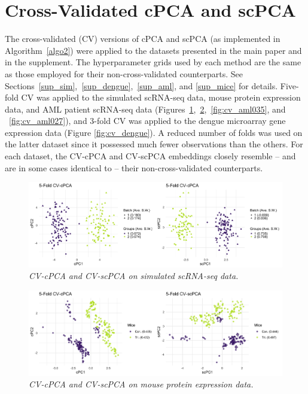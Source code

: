 \documentclass{article}
\begin{document}
\newpage

\section{Cross-Validated cPCA and scPCA}\label{cv_algo_example}

The cross-validated (CV) versions of cPCA and scPCA (as implemented in Algorithm~\ref{algo2}) were applied to the datasets presented in the main paper and in the supplement. The hyperparameter grids used by each method are the same as those employed for their non-cross-validated counterparts. See Sections~\ref{sup_sim},~\ref{sup_dengue},~\ref{sup_aml}, and \ref{sup_mice} for details. Five-fold CV was applied to the simulated scRNA-seq data, mouse protein expression data, and AML patient scRNA-seq data (Figures~\ref{fig:cv_sim},~\ref{fig:cv_mice},~\ref{fig:cv_aml035}, and ~\ref{fig:cv_aml027}), and 3-fold CV was applied to the dengue microarray gene expression data (Figure \ref{fig:cv_dengue}). A reduced number of folds was used on the latter dataset since it possessed much fewer observations than the others. For each dataset, the CV-cPCA and CV-scPCA embeddings closely resemble -- and are in some cases identical to -- their non-cross-validated counterparts.

\begin{figure}
    \centering
    \includegraphics[width = \textwidth]{figures/sim_cv_results.png}
    \caption{\em{CV-cPCA and CV-scPCA on simulated scRNA-seq data.}}
    \label{fig:cv_sim}
\end{figure}

\begin{figure}
    \centering
    \includegraphics[width = \textwidth]{figures/mice_cv_results.png}
    \caption{\em{CV-cPCA and CV-scPCA on mouse protein expression data.}}
    \label{fig:cv_mice}
\end{figure}
\end{document}
